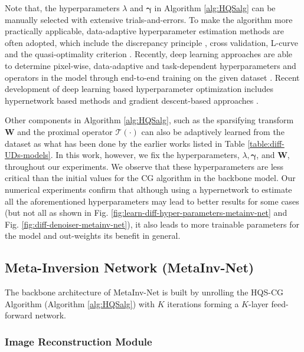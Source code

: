 \documentclass[journal,twoside]{IEEEtran}
\begin{document}
Note that, the hyperparameters $\lambda$ and $\bm{\gamma}$ in Algorithm \ref{alg:HQSalg} can be manually selected with extensive trials-and-errors. To make the algorithm more practically applicable, data-adaptive hyperparameter estimation methods are often adopted, which include the discrepancy principle \cite{morozov1966solution,morozov2012methods}, cross validation, L-curve \cite{morozov1966solution} and the quasi-optimality criterion \cite{morozov1966solution}. Recently, deep learning approaches are able to determine pixel-wise, data-adaptive and task-dependent hyperparameters and operators in the model through end-to-end training on the given dataset \cite{yang2016deep,adler2018learned,Meinhardt_2017learn_prox_op,gregor2010learning}. Recent development of deep learning based hyperparameter optimization includes hypernetwork based methods \cite{lorraine2018stochastic,liu2019metapruning,zhang2019graph} and gradient descent-based approaches \cite{bengio2000gradient,maclaurin2015gradient,luketina2016scalable,andrychowicz2016learning,franceschi2017forward}. 

Other components in Algorithm \ref{alg:HQSalg}, such as the sparsifying transform $\bm{W}$ and the proximal operator $\mathcal{T}(\cdot)$ can also be adaptively learned from the dataset as what has been done by the earlier works listed in Table \ref{table:diff-UDs-models}. In this work, however, we fix the hyperparameters, $\lambda, \bm{\gamma}$, and $\bm{W}$, throughout our experiments. We observe that these hyperparameters are less critical than the initial values for the CG algorithm in the backbone model. Our numerical experiments confirm that although using a hypernetwork to estimate all the aforementioned hyperparameters may lead to better results for some cases (but not all as shown in Fig. \ref{fig:learn-diff-hyper-parameters-metainv-net} and Fig. \ref{fig:diff-denoiser-metainv-net}), it also leads to more trainable parameters for the model and out-weights its benefit in general.


\subsection{Meta-Inversion Network (MetaInv-Net)}
The backbone architecture of MetaInv-Net is built by unrolling the HQS-CG Algorithm (Algorithm \ref{alg:HQSalg}) with $K$ iterations forming a $K$-layer feed-forward network.

\subsubsection{Image Reconstruction Module}
\end{document}
